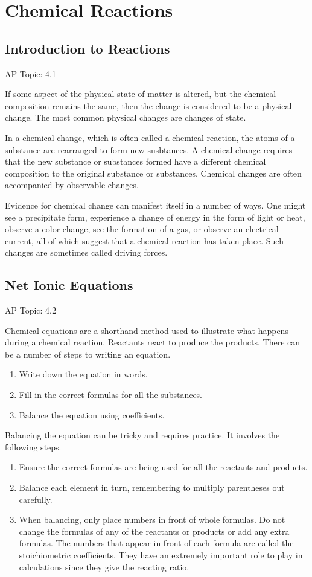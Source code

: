 \documentclass[../chem.tex]{subfiles}
\begin{document}
\chapter{Chemical Reactions}
\section{Introduction to Reactions}
AP Topic: 4.1

If some aspect of the physical state of matter is altered, but the chemical composition remains the same, then the change is considered to be 
a physical change. The most common physical changes are changes of state.

In a chemical change, which is often called a chemical reaction, the atoms of a substance are rearranged to form new susbtances. A chemical change 
requires that the new substance or substances formed have a different chemical composition to the original substance or substances. Chemical 
changes are often accompanied by observable changes.

Evidence for chemical change can manifest itself in a number of ways. One might see a precipitate form, experience a change of energy in the form of 
light or heat, observe a color change, see the formation of a gas, or observe an electrical current, all of which suggest that a chemical reaction 
has taken place. Such changes are sometimes called driving forces.
\section{Net Ionic Equations}
AP Topic: 4.2

Chemical equations are a shorthand method used to illustrate what happens during a chemical reaction. Reactants react to produce the products. 
There can be a number of steps to writing an equation.
\begin{enumerate}
    \item Write down the equation in words.
    \item Fill in the correct formulas for all the substances.
    \item Balance the equation using coefficients.
\end{enumerate}

Balancing the equation can be tricky and requires practice. It involves the following steps.

\begin{enumerate}
    \item Ensure the correct formulas are being used for all the reactants and products.
    \item Balance each element in turn, remembering to multiply parentheses out carefully. 
    \item When balancing, only place numbers in front of whole formulas. Do not change the formulas of any of the reactants or products or add any extra formulas. The numbers that appear in front of each formula are called the stoichiometric coefficients. They have an extremely important role to play in calculations since they give the reacting ratio.
\end{enumerate}
\end{document}
